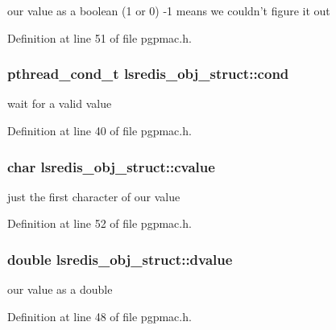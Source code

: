 our value as a boolean (1 or 0) -\/1 means we couldn't figure it out 



Definition at line 51 of file pgpmac.\-h.

\hypertarget{structlsredis__obj__struct_a356f6a228bb19ac7d66fdb1c875d68be}{
\subsubsection[{cond}]{\setlength{\rightskip}{0pt plus 5cm}pthread\-\_\-cond\-\_\-t lsredis\-\_\-obj\-\_\-struct\-::cond}}\label{structlsredis__obj__struct_a356f6a228bb19ac7d66fdb1c875d68be}


wait for a valid value 



Definition at line 40 of file pgpmac.\-h.

\hypertarget{structlsredis__obj__struct_a4a5933dbd44d33d9f594f6020a443b69}{
\subsubsection[{cvalue}]{\setlength{\rightskip}{0pt plus 5cm}char lsredis\-\_\-obj\-\_\-struct\-::cvalue}}\label{structlsredis__obj__struct_a4a5933dbd44d33d9f594f6020a443b69}


just the first character of our value 



Definition at line 52 of file pgpmac.\-h.

\hypertarget{structlsredis__obj__struct_ab60d0a71cabad6b921b6edb5a8f68996}{
\subsubsection[{dvalue}]{\setlength{\rightskip}{0pt plus 5cm}double lsredis\-\_\-obj\-\_\-struct\-::dvalue}}\label{structlsredis__obj__struct_ab60d0a71cabad6b921b6edb5a8f68996}


our value as a double 



Definition at line 48 of file pgpmac.\-h.

